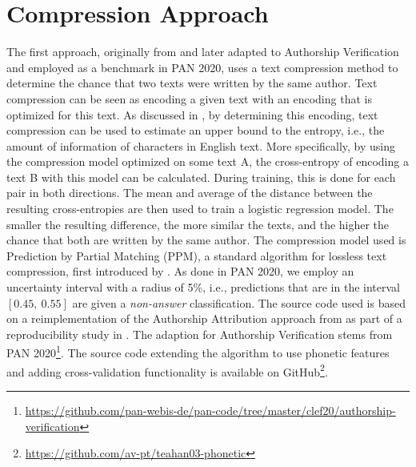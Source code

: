 \section{Compression Approach}\label{sec:compression-approach}
The first approach, originally from \cite{teahan2003compression} and later adapted to Authorship Verification and employed as a benchmark in PAN 2020, uses a text compression method to determine the chance that two texts were written by the same author.
Text compression can be seen as encoding a given text with an encoding that is optimized for this text.
As discussed in \cite{brown1992upperBoundEntropy}, by determining this encoding, text compression can be used to estimate an upper bound to the entropy, i.e., the amount of information of characters in English text.
More specifically, by using the compression model optimized on some text A, the cross-entropy of encoding a text B with this model can be calculated.
During training, this is done for each pair in both directions.
The mean and average of the distance between the resulting cross-entropies are then used to train a logistic regression model.
The smaller the resulting difference, the more similar the texts, and the higher the chance that both are written by the same author.
The compression model used is Prediction by Partial Matching (PPM), a standard algorithm for lossless text compression, first introduced by \cite{cleary1984PPM}.
As done in PAN 2020, we employ an uncertainty interval with a radius of 5\%, i.e., predictions that are in the interval $[0.45,~0.55]$ are given a \textit{non-answer} classification.
The source code used is based on a reimplementation of the Authorship Attribution approach from \cite{teahan2003compression} as part of a reproducibility study in \cite{potthast2016reimplementation}.
The adaption for Authorship Verification stems from PAN 2020\footnote{\url{https://github.com/pan-webis-de/pan-code/tree/master/clef20/authorship-verification}}.
The source code extending the algorithm to use phonetic features and adding cross-validation functionality is available on GitHub\footnote{\url{https://github.com/av-pt/teahan03-phonetic}}.

